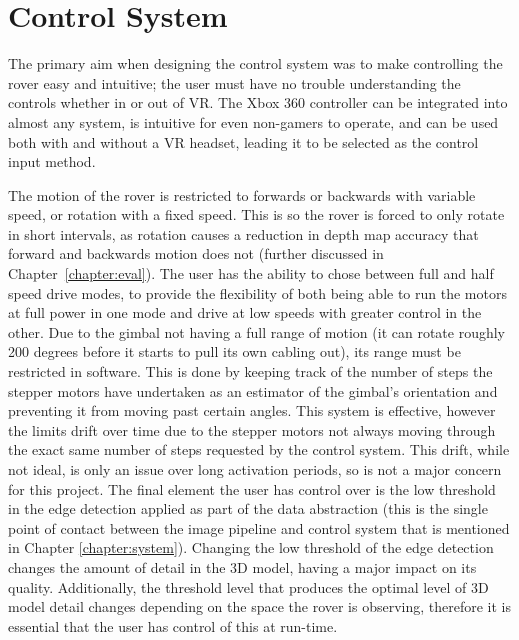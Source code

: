 \begin{table}[H]
\centering
\caption{Data Packet Format.}
\label{table:packet}
\end{table}

\section{Control System}

The primary aim when designing the control system was to make controlling the rover easy and intuitive; the user must have no trouble understanding the controls whether in or out of VR. The Xbox 360 controller can be integrated into almost any system, is intuitive for even non-gamers to operate, and can be used both with and without a VR headset, leading it to be selected as the control input method.

The motion of the rover is restricted to forwards or backwards with variable speed, or rotation with a fixed speed. This is so the rover is forced to only rotate in short intervals, as rotation causes a reduction in depth map accuracy that forward and backwards motion does not (further discussed in Chapter~\ref{chapter:eval}). The user has the ability to chose between full and half speed drive modes, to provide the flexibility of both being able to run the motors at full power in one mode and drive at low speeds with greater control in the other. Due to the gimbal not having a full range of motion (it can rotate roughly 200 degrees before it starts to pull its own cabling out), its range must be restricted in software. This is done by keeping track of the number of steps the stepper motors have undertaken as an estimator of the gimbal's orientation and preventing it from moving past certain angles. This system is effective, however the limits drift over time due to the stepper motors not always moving through the exact same number of steps requested by the control system. This drift, while not ideal, is only an issue over long activation periods, so is not a major concern for this project. The final element the user has control over is the low threshold in the edge detection applied as part of the data abstraction (this is the single point of contact between the image pipeline and control system that is mentioned in Chapter \ref{chapter:system}). Changing the low threshold of the edge detection changes the amount of detail in the 3D model, having a major impact on its quality. Additionally, the threshold level that produces the optimal level of 3D model detail changes depending on the space the rover is observing, therefore it is essential that the user has control of this at run-time.

